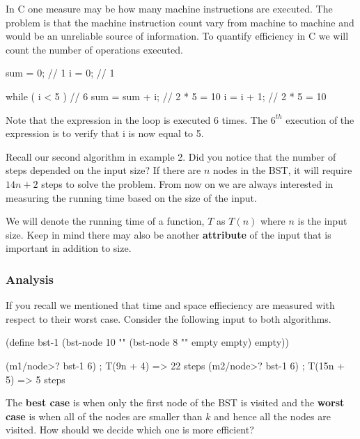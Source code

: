 In C one measure may be how many machine instructions are executed. The problem is that the machine instruction count vary from machine to machine and would be an unreliable source of information. To quantify efficiency in C we will count the number of operations executed.\\

\begin{code}[c]
sum = 0;               // 1
i = 0;                 // 1

while ( i < 5 ) {      // 6
  sum = sum + i;       // 2 * 5 = 10
  i = i + 1;           // 2 * 5 = 10
}
\end{code}

Note that the expression in the loop is executed 6 times. The $6^{th}$ execution of the expression is to verify that i is now equal to 5.


Recall our second algorithm in example 2. Did you notice that the number of steps depended on the input size? If there are $n$ nodes in the BST, it will require $14n + 2$ steps to solve the problem. From now on we are always interested in measuring the running time based on the size of the input.\\


We will denote the running time of a function, $T$ as $T(n)$ where $n$ is the input size. Keep in mind there may also be another \textbf{attribute} of the input that is important in addition to size.

\subsubsection*{Analysis}

If you recall we mentioned that time and space effieciency are measured with respect to their worst case. Consider the following input to both algorithms.\\

\begin{code}[Lisp]
(define bst-1 (bst-node 10 "" (bst-node 8 "" empty empty) empty))

(m1/node>? bst-1 6) ; T(9n + 4) => 22 steps
(m2/node>? bst-1 6) ; T(15n + 5) => 5 steps
\end{code}

The \textbf{best case} is when only the first node of the BST is visited and the \textbf{worst case} is when all of the nodes are smaller than $k$ and hence all the nodes are visited. How should we decide which one is more efficient?\\


